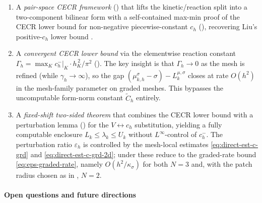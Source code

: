 \documentclass[11pt]{article}
\theoremstyle{plain}
\theoremstyle{definition}
\theoremstyle{remark}
\begin{document}
\begin{enumerate}[label=(\roman*)]
\item A \emph{pair-space CECR framework}
  () that lifts the kinetic/reaction split into a
  two-component bilinear form with a self-contained max-min proof
  of the CECR lower bound for non-negative piecewise-constant $c_h$
  (), recovering Liu's positive-$c_h$
  lower bound \cite{Liu2015}.

\item A \emph{convergent CECR lower bound} via the elementwise
  reaction constant $\Gamma_h=\max_K c_h^-|_K\cdot h_K^{\,2}/\pi^2$
  (). The key insight is that
  $\Gamma_h\to 0$ as the mesh is refined (while
  $\gamma_h\to\infty$), so the gap
  $(\mu_{k,h}^\sigma{-}\sigma)-L_k^{\mu,\sigma}$ closes at rate
  $O(h^2)$ in the mesh-family parameter on graded meshes. This bypasses the
  uncomputable form-norm constant
  $\widetilde C_h$ entirely.

\item A \emph{fixed-shift two-sided theorem} 
  that combines the CECR lower bound with a perturbation lemma
  () for the $V\leftrightarrow c_h$
  substitution, yielding a fully computable enclosure
  $L_k\le\lambda_k\le U_k$ without $L^\infty$-control of $c_h^-$.
  The perturbation ratio $\varepsilon_h$ is controlled by the
  mesh-local estimates \eqref{eq:direct-est-c-grd} and
  \eqref{eq:direct-est-c-grd-2d}; under  these reduce to the
  graded-rate bound \eqref{eq:eps-graded-rate}, namely
  $O(h^2/\kappa_\sigma)$ for both $N=3$ and, with the patch radius
  chosen as in , $N=2$.


\end{enumerate}

\paragraph{Open questions and future directions}
\end{document}
